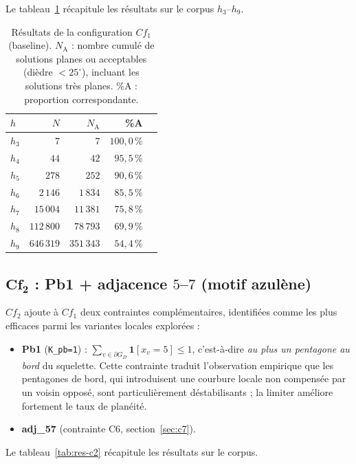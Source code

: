 \documentclass[11pt,a4paper]{article}
\newcommand{\GD}{\ensuremath{G_D}}                 %
\begin{document}
Le tableau~\ref{tab:res-c1} récapitule les résultats sur le corpus
$h_3$--$h_9$.

\begin{table}[h]
\centering
\small
\begin{tabular}{lrrrr}
\toprule
$h$ & $N$ & $N_{\text{A}}$ & \%A \\
\midrule
$h_3$ & $7$        & $7$        & $100{,}0\,\%$ \\
$h_4$ & $44$       & $42$       & $95{,}5\,\%$  \\
$h_5$ & $278$      & $252$      & $90{,}6\,\%$  \\
$h_6$ & $2\,146$   & $1\,834$   & $85{,}5\,\%$  \\
$h_7$ & $15\,004$  & $11\,381$  & $75{,}8\,\%$  \\
$h_8$ & $112\,800$ & $78\,793$  & $69{,}9\,\%$  \\
$h_9$ & $646\,319$ & $351\,343$ & $54{,}4\,\%$  \\
\bottomrule
\end{tabular}
\caption{Résultats de la configuration $Cf_1$ (baseline). $N_{\text{A}}$ :
nombre cumulé de solutions planes ou acceptables (dièdre $< 25^\circ$),
incluant les solutions très planes. \%A : proportion correspondante.}
\label{tab:res-c1}
\end{table}

\subsection{$\mathbf{Cf_2}$ : Pb1 + adjacence $5$--$7$ (motif azulène)}

$Cf_2$ ajoute à $Cf_1$ deux contraintes complémentaires, identifiées comme les
plus efficaces parmi les variantes locales explorées :
\begin{itemize}[leftmargin=1.4em]
  \item \textbf{Pb1} (\texttt{K\_pb=1}) :
    $\sum_{v \in \partial \GD} \mathbf{1}[x_v = 5] \le 1$, c'est-à-dire
    \emph{au plus un pentagone au bord} du squelette. Cette contrainte traduit
    l'observation empirique que les pentagones de bord, qui introduisent une
    courbure locale non compensée par un voisin opposé, sont particulièrement
    déstabilisants ; la limiter améliore fortement le taux de planéité.
  \item \textbf{adj\_57} (contrainte C6, section~\ref{sec:c7}).
\end{itemize}

Le tableau~\ref{tab:res-c2} récapitule les résultats sur le corpus.
\end{document}
